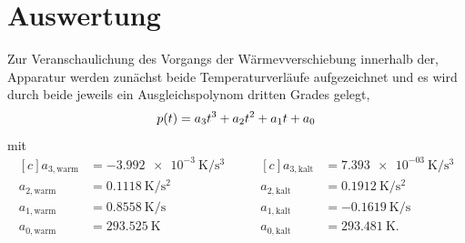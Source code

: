 


\section{Auswertung}
\label{sec:Auswertung}


Zur Veranschaulichung des Vorgangs der Wärmevverschiebung innerhalb der,
Apparatur werden zunächst beide Temperaturverläufe aufgezeichnet und es wird durch beide jeweils ein Ausgleichspolynom dritten Grades gelegt,
\begin{equation*}
p(t) = a_3t^3 + a_2t^2 + a_1t+a_0\\
\end{equation*}
mit
\begin{equation*}
\begin{aligned}[c]
a_{3,\text{warm}} &= \SI{-3,992e-3}{\kelvin\per\second\cubed}\\
a_{2,\text{warm}} &= \SI{0,1118}{\kelvin\per\second\squared}\\
a_{1,\text{warm}} &= \SI{0,8558}{\kelvin\per\second}\\  a_{0,\text{warm}} &= \SI{293,525}{\kelvin}\\
\end{aligned}
\qquad
\begin{aligned}[c]
a_{3,\text{kalt}}&= \SI{7,393e-03}{\kelvin\per\second\cubed}\\
a_{2,\text{kalt}}&= \SI{0,1912}{\kelvin\per\second\squared}\\ 
a_{1,\text{kalt}}&= \SI{-0,1619}{\kelvin\per\second}\\
a_{0,\text{kalt}}&= \SI{293,481}{\kelvin}.\\
\end{aligned}
\end{equation*}

